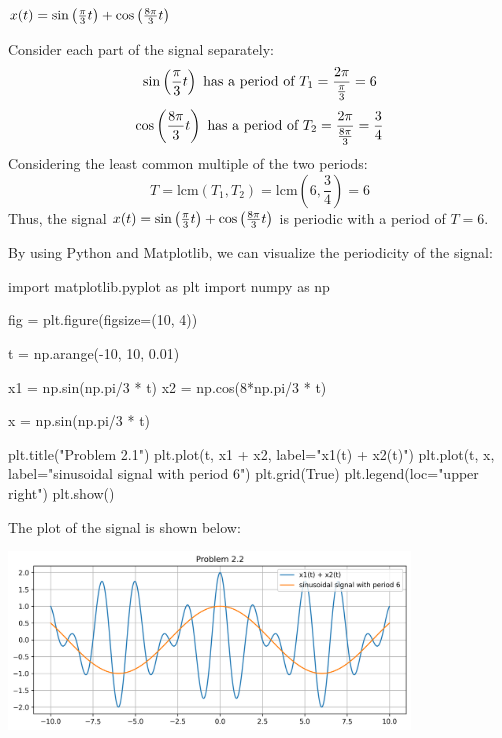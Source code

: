 \documentclass[a4paper, 10pt]{article}
\begin{document}
\begin{subproblems}
    \item \( x(t) = \sin \left( \frac{\pi}{3}t \right) + \cos \left( \frac{8\pi}{3}t \right) \)
\end{subproblems}

\begin{solution}
Consider each part of the signal separately:
\[
\sin \left( \frac{\pi}{3}t \right) \text{ has a period of } T_1 = \frac{2\pi}{\frac{\pi}{3}} = 6
\]
\[
\cos \left( \frac{8\pi}{3}t \right) \text{ has a period of } T_2 = \frac{2\pi}{\frac{8\pi}{3}} = \frac{3}{4}
\]
Considering the least common multiple of the two periods:
\[
T = \text{lcm}(T_1, T_2) = \text{lcm}(6, \frac{3}{4}) = 6
\]
Thus, the signal \( x(t) = \sin \left( \frac{\pi}{3}t \right) + \cos \left( \frac{8\pi}{3}t \right) \) is periodic with a period of \( T = 6 \).

\vspace{5mm}

By using Python and Matplotlib, we can visualize the periodicity of the signal:
\begin{codingbox}
import matplotlib.pyplot as plt
import numpy as np

fig = plt.figure(figsize=(10, 4))

t = np.arange(-10, 10, 0.01)

x1 = np.sin(np.pi/3 * t)
x2 = np.cos(8*np.pi/3 * t)

x = np.sin(np.pi/3 * t)

plt.title("Problem 2.1")
plt.plot(t, x1 + x2, label="x1(t) + x2(t)")
plt.plot(t, x, label="sinusoidal signal with period 6")
plt.grid(True)
plt.legend(loc="upper right")
plt.show()
\end{codingbox}
The plot of the signal is shown below:
\begin{center}
    \includegraphics[width=0.8\textwidth]{images/problem_2_1.png}
\end{center}
\end{solution}
\end{document}
